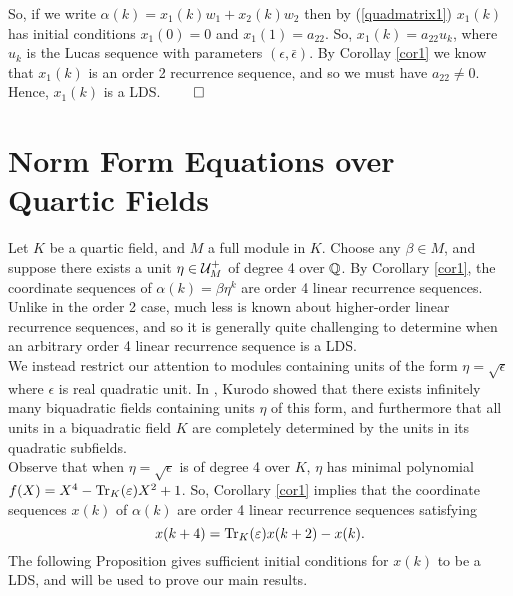 \documentclass[11pt]{amsart}
\begin{document}
So, if we write $\alpha(k)=x_1(k)w_1+x_2(k)w_2$ then by (\ref{quadmatrix1}) $x_1(k)$ has initial conditions $x_1(0)=0$ and $x_1(1)=a_{22}$. So, $x_1(k)=a_{22} u_k$, where $u_k$ is the Lucas sequence with parameters $(\epsilon, \bar{\epsilon})$. By Corollay \ref{cor1} we know that $x_1(k)$ is an order 2 recurrence sequence, and so we must have $a_{22}\not=0$. Hence, $x_1(k)$ is a LDS. \hfill $\qed$



\section{Norm Form Equations over Quartic Fields}
Let $K$ be a quartic field, and $M$ a full module in $K$. Choose any $\beta \in M$, and suppose there exists a unit $\eta \in \mathcal{U}_M^+$ of degree 4 over $\mathbb{Q}$. By Corollary \ref{cor1}, the coordinate sequences of $\alpha(k)=\beta \eta^k$ are order 4 linear recurrence sequences. Unlike in the order 2 case, much less is known about higher-order linear recurrence sequences, and so it is generally quite challenging to determine when an arbitrary order 4 linear recurrence sequence is a LDS. \\

We instead restrict our attention to modules containing units of the form $\eta=\sqrt{\epsilon}$ where $\epsilon$ is real quadratic unit. In \cite{kuroda}, Kurodo showed that there exists infinitely many biquadratic fields containing units $\eta$ of this form, and furthermore that all units in a biquadratic field $K$ are completely determined by the units in its quadratic subfields. \\

Observe that when $\eta=\sqrt{\epsilon}$ is of degree 4 over $K$, $\eta$ has minimal polynomial $f(X)=X^4-\operatorname{Tr}_K(\varepsilon)X^2+1$. So, Corollary \ref{cor1} implies that the coordinate sequences $x(k)$ of $\alpha(k)$ are order 4 linear recurrence sequences satisfying
\begin{equation}
\label{order4rec} x(k+4)=\operatorname{Tr}_K(\varepsilon)x(k+2)-x(k).
\end{equation}
The following Proposition gives sufficient initial conditions for $x(k)$ to be a LDS, and will be used to prove our main results. 
\end{document}
